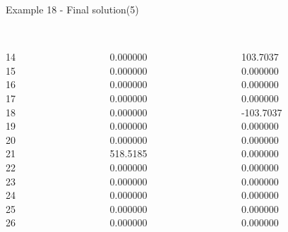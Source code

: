 \begin{frame}{Example 18 - Final solution(5)}
\begin{columns}[t]
\begin{column}{0.3\textwidth}
\\

14\\
15\\
16\\
17\\
18\\
19\\
20\\
21\\
22\\
23\\
24\\
25\\
26\\

\end{column}
\begin{column}{0.3\textwidth}
\\
0.000000\\
0.000000\\
0.000000\\
0.000000\\
0.000000\\
0.000000\\
0.000000\\
518.5185\\
0.000000\\
0.000000\\
0.000000\\
0.000000\\
0.000000\\

\end{column}  

\begin{column}{0.3\textwidth}
\\

103.7037\\
0.000000\\
0.000000\\
0.000000\\
-103.7037\\
0.000000\\
0.000000\\
0.000000\\
0.000000\\
0.000000\\
0.000000\\
0.000000\\
0.000000\\
\end{column}
\end{columns}
\end{frame}

